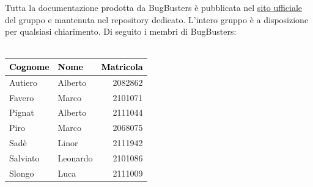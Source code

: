 \documentclass[a4paper,11pt]{article}
\begin{document}
Tutta la documentazione prodotta da BugBusters è pubblicata nel \href{https://bugbustersunipd.github.io/BugBusterSite/}{sito ufficiale} del gruppo e mantenuta nel repository dedicato.
L'intero gruppo è a disposizione per qualsiasi chiarimento. Di seguito i membri di BugBusters: \\ \\ 
\begin{center}
\setlength{\arrayrulewidth}{0.8pt}
\begin{tabular}{|l|l|r|}
\hline
\rowcolor{primarycolor!20}
\textcolor{black}{\textbf{Cognome}} & \textcolor{black}{\textbf{Nome}} & \textcolor{black}{\textbf{Matricola}} \\
\hline
Autiero & Alberto & 2082862 \\
\hline
Favero & Marco & 2101071 \\
\hline
Pignat & Alberto & 2111044 \\
\hline
Piro & Marco & 2068075 \\
\hline
Sadè & Linor & 2111942 \\
\hline
Salviato & Leonardo & 2101086 \\
\hline
Slongo & Luca & 2111009 \\
\hline
\end{tabular}
\end{center}
\end{document}
